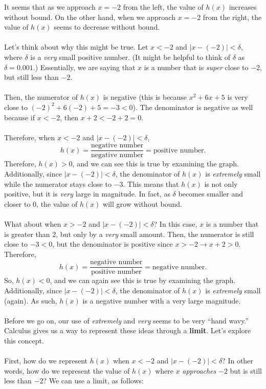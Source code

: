 \documentclass{article}
\begin{document}
It seems that as we approach $x=-2$ from the left, the value of $h(x)$ increases without bound. On the other hand, when we approach $x=-2$ from the right, the value of $h(x)$ seems to decrease without bound. 
\\
\\
Let's think about why this might be true. Let $x<-2$ and $\left|x-(-2)\right|<\delta$, where $\delta$ is a \textit{very} small positive number. (It might be helpful to think of $\delta$ as $\delta=0.001$.) Essentially, we are saying that $x$ is a number that is \textit{super} close to $-2$, but still less than $-2$.
\\
\\
Then, the numerator of $h(x)$ is negative (this is because $x^2+6x+5$ is very close to $(-2)^2+6(-2)+5=-3<0$). The denominator is negative as well because if $x<-2$, then $x+2<-2+2=0$.
\\
\\
Therefore, when $x<-2$ and $\left|x-(-2)\right|<\delta$, 
\[h(x)=\frac{\text{negative number}}{\text{negative number}}=\text{positive number}.\]
Therefore, $h(x)>0$, and we can see this is true by examining the graph. Additionally, since $\left|x-(-2)\right|<\delta$, the denominator of $h(x)$ is \textit{extremely} small while the numerator stays close to $-3$. This means that $h(x)$ is not only positive, but it is \textit{very} large in magnitude. In fact, as $\delta$ becomes smaller and closer to 0, the value of $h(x)$ will grow without bound. 
\\
\\
What about when $x>-2$ and $\left|x-(-2)\right|<\delta$? In this case, $x$ is a number that is greater than 2, but only by a \textit{very} small amount. Then, the numerator is still close to $-3<0$, but the denominator is positive since $x>-2\to x+2>0$. Therefore, 
\[h(x)=\frac{\text{negative number}}{\text{positive number}}=\text{negative number}.\]
So, $h(x)<0$, and we can again see this is true by examining the graph. Additionally, since $\left|x-(-2)\right|<\delta$, the denominator of $h(x)$ is \textit{extremely} small (again). As such, $h(x)$ is a negative number with a very large magnitude. 
\\
\\
Before we go on, our use of \textit{extremely} and \textit{very} seems to be very ``hand wavy.'' Calculus gives us a way to represent these ideas through a \textbf{limit}. Let's explore this concept.
\\
\\
First, how do we represent $h(x)$ when $x<-2$ and $\left|x-(-2)\right|<\delta$? In other words, how do we represent the value of $h(x)$ where $x$ \textit{approaches} $-2$ but is still less than $-2$? We can use a limit, as follows:
\end{document}
